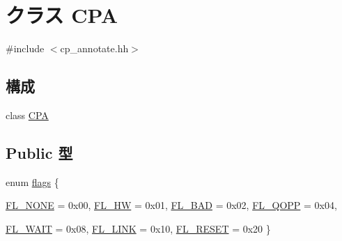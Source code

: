\hypertarget{classCPA}{
\section{クラス CPA}
\label{classCPA}
}


{\ttfamily \#include $<$cp\_\-annotate.hh$>$}\subsection*{構成}
\begin{DoxyCompactItemize}
\item 
class \hyperlink{classCPA_1_1CPA}{CPA}
\end{DoxyCompactItemize}
\subsection*{Public 型}
\begin{DoxyCompactItemize}
\item 
enum \hyperlink{classCPA_ab6b306ef981f5e21bb41ea2c2dbe8cd9}{flags} \{ \par
\hyperlink{classCPA_ab6b306ef981f5e21bb41ea2c2dbe8cd9a96f120298159c9334e174bf9f286f63b}{FL\_\-NONE} =  0x00, 
\hyperlink{classCPA_ab6b306ef981f5e21bb41ea2c2dbe8cd9a6982b7839a4146199dff6d081420b9be}{FL\_\-HW} =  0x01, 
\hyperlink{classCPA_ab6b306ef981f5e21bb41ea2c2dbe8cd9a5a076f327c9aa2f6c61af677153ae7e0}{FL\_\-BAD} =  0x02, 
\hyperlink{classCPA_ab6b306ef981f5e21bb41ea2c2dbe8cd9ac018e940c4843f263f63bb9a91639ef1}{FL\_\-QOPP} =  0x04, 
\par
\hyperlink{classCPA_ab6b306ef981f5e21bb41ea2c2dbe8cd9a1af09ff68687381691eb2202f1993b86}{FL\_\-WAIT} =  0x08, 
\hyperlink{classCPA_ab6b306ef981f5e21bb41ea2c2dbe8cd9ad5a245eac1d5829354f54b683bc123c9}{FL\_\-LINK} =  0x10, 
\hyperlink{classCPA_ab6b306ef981f5e21bb41ea2c2dbe8cd9ab572802a869205fb4339fe5b019bc1fe}{FL\_\-RESET} =  0x20
 \}
\end{DoxyCompactItemize}
